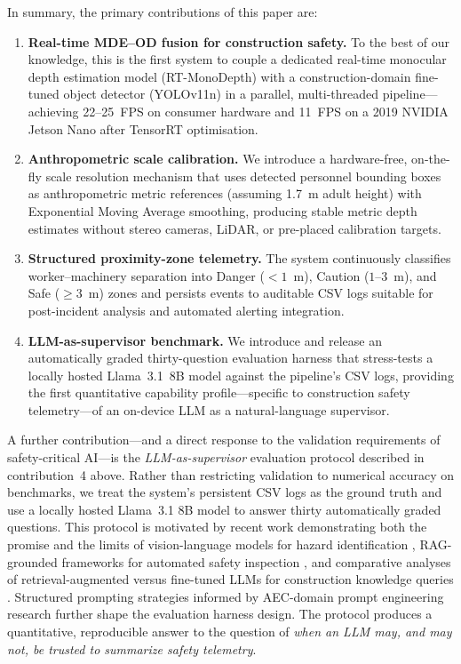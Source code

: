 \documentclass{article}
\begin{document}
In summary, the primary contributions of this paper are:
\begin{enumerate}
    \item \textbf{Real-time MDE--OD fusion for construction safety.} To the best of our knowledge, this is the first system to couple a dedicated real-time monocular depth estimation model (RT-MonoDepth) with a construction-domain fine-tuned object detector (YOLOv11n) in a parallel, multi-threaded pipeline---achieving 22--25~FPS on consumer hardware and 11~FPS on a 2019 NVIDIA Jetson Nano after TensorRT optimisation.
    \item \textbf{Anthropometric scale calibration.} We introduce a hardware-free, on-the-fly scale resolution mechanism that uses detected personnel bounding boxes as anthropometric metric references (assuming 1.7~m adult height) with Exponential Moving Average smoothing, producing stable metric depth estimates without stereo cameras, LiDAR, or pre-placed calibration targets.
    \item \textbf{Structured proximity-zone telemetry.} The system continuously classifies worker--machinery separation into Danger ($<1$~m), Caution ($1$--$3$~m), and Safe ($\geq 3$~m) zones and persists events to auditable CSV logs suitable for post-incident analysis and automated alerting integration.
    \item \textbf{LLM-as-supervisor benchmark.} We introduce and release an automatically graded thirty-question evaluation harness that stress-tests a locally hosted Llama~3.1~8B model against the pipeline's CSV logs, providing the first quantitative capability profile---specific to construction safety telemetry---of an on-device LLM as a natural-language supervisor.
\end{enumerate}

A further contribution---and a direct response to the validation requirements of safety-critical AI---is the \emph{LLM-as-supervisor} evaluation protocol described in contribution~4 above. Rather than restricting validation to numerical accuracy on benchmarks, we treat the system's persistent CSV logs as the ground truth and use a locally hosted Llama~3.1 8B model \cite{dubey2024llama,ollama2024} to answer thirty automatically graded questions. This protocol is motivated by recent work demonstrating both the promise and the limits of vision-language models for hazard identification \cite{adil2025}, RAG-grounded frameworks for automated safety inspection \cite{wang2025}, and comparative analyses of retrieval-augmented versus fine-tuned LLMs for construction knowledge queries \cite{lee2024}. Structured prompting strategies informed by AEC-domain prompt engineering research \cite{samsami2024} further shape the evaluation harness design. The protocol produces a quantitative, reproducible answer to the question of \emph{when an LLM may, and may not, be trusted to summarize safety telemetry}.
\end{document}
